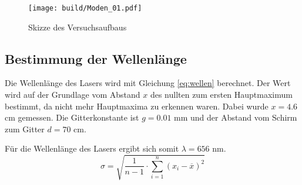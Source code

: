 \begin{figure}
  \centering
  \texttt{[image: build/Moden\_01.pdf]}
  \caption{Skizze des Versuchsaufbaus}
  \label{fig:Mode_01}
\end{figure}


\subsection{Bestimmung der Wellenlänge}
Die Wellenlänge des Lasers wird mit Gleichung \ref{eq:wellen} berechnet. Der Wert wird auf der Grundlage vom Abstand $x$ des
nullten zum ersten Hauptmaximum bestimmt, da nicht mehr Hauptmaxima zu erkennen waren.
Dabei wurde $x = 4.6$ cm gemessen.
Die Gitterkonstante ist $g = 0.01$ mm und der Abstand vom Schirm zum Gitter $d = 70$ cm.

Für die Wellenlänge des Lasers ergibt sich somit $\lambda = 656$ nm.
\begin{equation}
  \sigma = \sqrt{\frac{1}{n-1} \cdot \sum_{i=1}^n(x_i-\overline{x})^2}
  \label{eqn:Stdabweichung}
\end{equation}